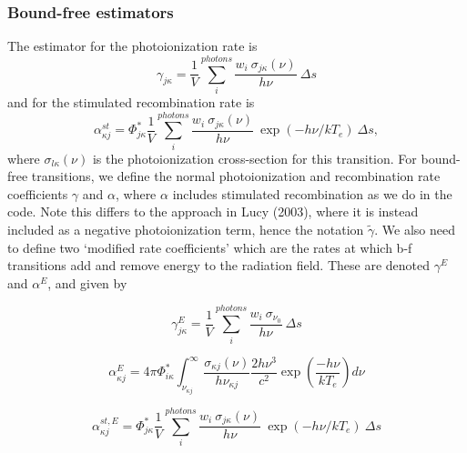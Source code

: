 \subsubsection{Bound-free estimators}
The estimator for the photoionization rate is 
\begin{equation}
\gamma_{j\kappa} = \frac{1}{V} \sum_i^{photons} 
\frac{w_i~\sigma_{j\kappa}({\nu})}{h \nu}~\Delta s
\end{equation}
and for the stimulated recombination rate is
\begin{equation}
\alpha_{\kappa j}^{st} = \Phi^*_{j\kappa}
\frac{1}{V} \sum_i^{photons} 
\frac{w_i~\sigma_{j\kappa}({\nu})}{h \nu}
~\exp(-h\nu/kT_e)~\Delta s,
\end{equation}
where $\sigma_{l\kappa} (\nu)$ is the photoionization cross-section for this transition.
For bound-free transitions, we define the normal photoionization and recombination
rate coefficients $\gamma$ and $\alpha$, where $\alpha$ includes
stimulated recombination as we do in the code. Note
this differs to the approach in Lucy (2003), where it is instead included as a 
negative photoionization term, hence the notation $\widetilde{\gamma}$.
We also need to define two `modified rate coefficients' which 
are the rates at which b-f transitions add and remove energy to the radiation field.
These are denoted $\gamma^E$ and $\alpha^E$, and given by

\begin{equation}
\gamma^E_{j\kappa} = \frac{1}{V} \sum_i^{photons} \frac{w_i~\sigma_{\nu_0}}{h \nu}~\Delta s 
\end{equation}

\begin{equation}
\alpha^E_{\kappa j} = 4\pi \Phi^*_{i\kappa} \int^\infty_{\nu_{\kappa j}} 
\frac{\sigma_{\kappa j}(\nu)}{h \nu_{\kappa j}} \frac{2 h \nu^3}{c^2} 
\exp \left( \frac{- h \nu}{k T_e} \right) d\nu
\end{equation}

\begin{equation}
\alpha_{\kappa j}^{st,E} = \Phi^*_{j\kappa}
\frac{1}{V} \sum_i^{photons} 
\frac{w_i~\sigma_{j\kappa}({\nu})}{h \nu}
~\exp(-h\nu/kT_e)~\Delta s
\end{equation}

